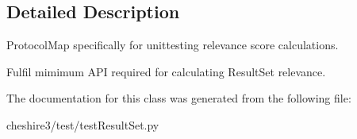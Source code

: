 \subsection{Detailed Description}
\begin{DoxyVerb}ProtocolMap specifically for unittesting relevance score calculations.

Fulfil mimimum API required for calculating ResultSet relevance.
\end{DoxyVerb}
 

The documentation for this class was generated from the following file\-:\begin{DoxyCompactItemize}
\item 
cheshire3/test/test\-Result\-Set.\-py\end{DoxyCompactItemize}

